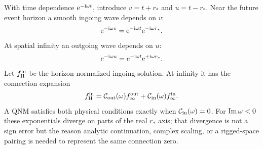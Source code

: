 With time dependence $\mathrm{e}^{-\mathrm{i}\omega t}$, introduce
$v=t+r_*$ and $u=t-r_*$.  Near the future event horizon a smooth ingoing wave
depends on $v$:
\begin{equation}
  \mathrm{e}^{-\mathrm{i}\omega v}
  =\mathrm{e}^{-\mathrm{i}\omega t}\mathrm{e}^{-\mathrm{i}\omega r_*}.
\end{equation}
At spatial infinity an outgoing wave depends on $u$:
\begin{equation}
  \mathrm{e}^{-\mathrm{i}\omega u}
  =\mathrm{e}^{-\mathrm{i}\omega t}\mathrm{e}^{+\mathrm{i}\omega r_*}.
\end{equation}
Let $f^{\mathrm{in}}_{\mathrm{H}}$ be the horizon-normalized ingoing solution.  At
infinity it has the connection expansion
\begin{equation}
  f^{\mathrm{in}}_{\mathrm{H}}
  =\mathcal C_{\mathrm{out}}(\omega)f_\infty^{\mathrm{out}}
  +\mathcal{C}_{\mathrm{in}}(\omega)f_\infty^{\mathrm{in}}.
\end{equation}
A QNM satisfies both physical conditions exactly when
$\mathcal{C}_{\mathrm{in}}(\omega)=0$.  For $\operatorname{Im}\omega<0$ these exponentials diverge
on parts of the real $r_*$ axis; that divergence is not a sign error but the
reason analytic continuation, complex scaling, or a rigged-space pairing is
needed to represent the same connection zero.
